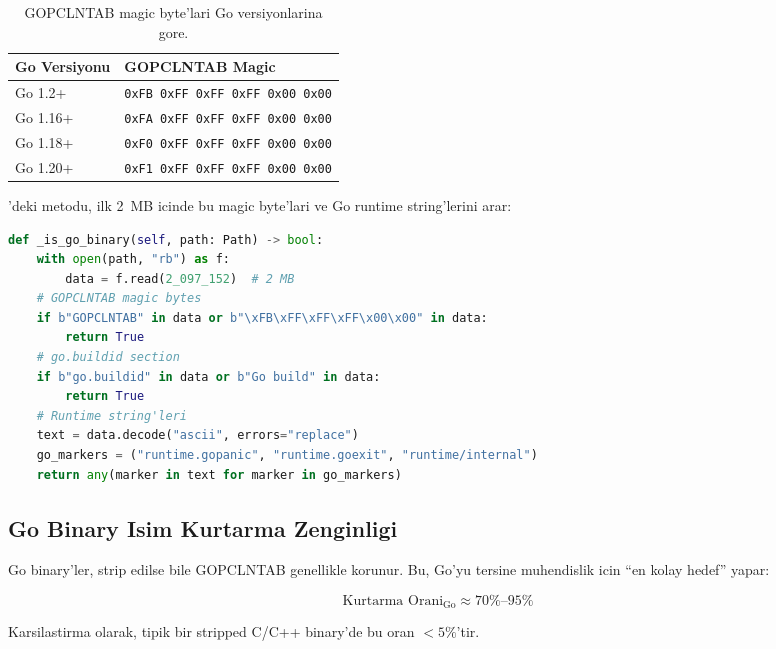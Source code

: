 \begin{table}[htbp]
\centering
\begin{tabular}{ll}
\toprule
\textbf{\color{sectioncyan}Go Versiyonu} & \textbf{\color{sectioncyan}GOPCLNTAB Magic} \\
\midrule
Go 1.2+  & \texttt{0xFB 0xFF 0xFF 0xFF 0x00 0x00} \\
Go 1.16+ & \texttt{0xFA 0xFF 0xFF 0xFF 0x00 0x00} \\
Go 1.18+ & \texttt{0xF0 0xFF 0xFF 0xFF 0x00 0x00} \\
Go 1.20+ & \texttt{0xF1 0xFF 0xFF 0xFF 0x00 0x00} \\
\bottomrule
\end{tabular}
\caption{GOPCLNTAB magic byte'lari Go versiyonlarina gore.}
\label{tab:gopclntab-magic}
\end{table}

'deki  metodu, ilk 2~MB icinde bu magic byte'lari ve Go runtime string'lerini arar:

\begin{lstlisting}[language=Python, caption={Go binary tespit algoritmasi}]
def _is_go_binary(self, path: Path) -> bool:
    with open(path, "rb") as f:
        data = f.read(2_097_152)  # 2 MB
    # GOPCLNTAB magic bytes
    if b"GOPCLNTAB" in data or b"\xFB\xFF\xFF\xFF\x00\x00" in data:
        return True
    # go.buildid section
    if b"go.buildid" in data or b"Go build" in data:
        return True
    # Runtime string'leri
    text = data.decode("ascii", errors="replace")
    go_markers = ("runtime.gopanic", "runtime.goexit", "runtime/internal")
    return any(marker in text for marker in go_markers)
\end{lstlisting}

\subsection{Go Binary Isim Kurtarma Zenginligi}

Go binary'ler, strip edilse bile GOPCLNTAB genellikle korunur. Bu, Go'yu tersine muhendislik icin ``en kolay hedef'' yapar:

\begin{equation}
\label{eq:go-recovery}
\text{Kurtarma Orani}_{\text{Go}} \approx 70\%\text{--}95\%
\end{equation}

Karsilastirma olarak, tipik bir stripped C/C++ binary'de bu oran $<5\%$'tir.


